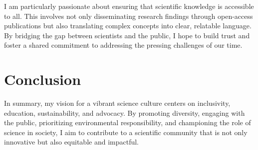 {\begin{flushleft}
I am particularly passionate about ensuring that scientific knowledge is accessible to all. This involves not only disseminating research findings through open-access publications but also translating complex concepts into clear, relatable language. By bridging the gap between scientists and the public, I hope to build trust and foster a shared commitment to addressing the pressing challenges of our time.

\vspace{\baselineskip}
\section{Conclusion}

In summary, my vision for a vibrant science culture centers on inclusivity, education, sustainability, and advocacy. By promoting diversity, engaging with the public, prioritizing environmental responsibility, and championing the role of science in society, I aim to contribute to a scientific community that is not only innovative but also equitable and impactful.

\end{flushleft}
}
